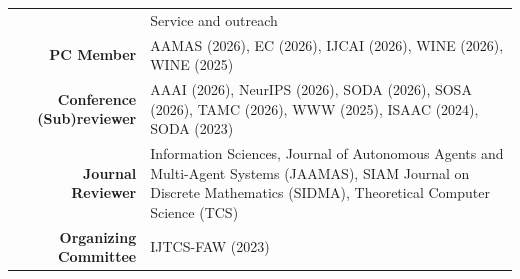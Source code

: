 \documentclass[letterpaper, 11pt]{article}
\newcommand{\headingfont}{\Large\color{OliveGreen}}
\newenvironment{SectionTable}[1]{
	\renewcommand*{\arraystretch}{1.2}
	\setlength{\tabcolsep}{10pt}
	\begin{longtable}{Rp{5.2in}} & #1 \\}
{\end{longtable}\vspace{-1cm}}
\begin{document}

\begin{SectionTable}{\headingfont Service and outreach}

\textbf{PC Member} &
AAMAS (2026), EC (2026), IJCAI (2026), WINE (2026), WINE (2025)\\

\textbf{Conference (Sub)reviewer} &
AAAI (2026), NeurIPS (2026), SODA (2026), SOSA (2026), TAMC (2026), WWW (2025), ISAAC (2024), SODA (2023)\\

\textbf{Journal Reviewer} &
Information Sciences, Journal of Autonomous Agents and Multi-Agent Systems (JAAMAS), SIAM Journal on Discrete Mathematics (SIDMA), Theoretical Computer Science (TCS)\\

\textbf{Organizing Committee} & 
IJTCS-FAW (2023)\\
\end{SectionTable}









\end{document}
